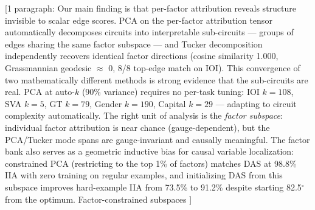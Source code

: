 \documentclass[11pt]{article}
\begin{document}
[1 paragraph: Our main finding is that per-factor attribution reveals
structure invisible to scalar edge scores. PCA on the per-factor
attribution tensor automatically decomposes circuits into interpretable
sub-circuits --- groups of edges sharing the same factor subspace --- and
Tucker decomposition independently recovers identical factor directions
(cosine similarity 1.000, Grassmannian geodesic $\approx$ 0, 8/8
top-edge match on IOI). This convergence of two mathematically different
methods is strong evidence that the sub-circuits are real. PCA at
auto-$k$ (90\% variance) requires no per-task tuning: IOI $k{=}108$,
SVA $k{=}5$, GT $k{=}79$, Gender $k{=}190$, Capital $k{=}29$ ---
adapting to circuit complexity automatically. The right unit of analysis
is the \emph{factor subspace}: individual factor attribution is near
chance (gauge-dependent), but the PCA/Tucker mode spans are
gauge-invariant and causally meaningful. The factor bank also serves as
a geometric inductive bias for causal variable localization: constrained
PCA (restricting to the top 1\% of factors) matches DAS at 98.8\% IIA
with zero training on regular examples, and initializing DAS from this
subspace improves hard-example IIA from 73.5\% to 91.2\% despite
starting 82.5$^\circ$ from the optimum. Factor-constrained subspaces
]

\end{document}
